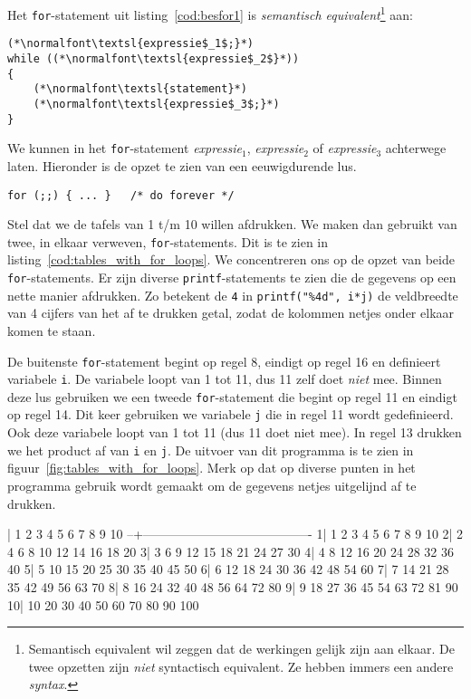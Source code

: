 Het \texttt{for}-statement uit listing~\ref{cod:besfor1} is \textsl{semantisch equivalent}\footnote{Semantisch equivalent wil zeggen dat de werkingen gelijk zijn aan elkaar. De twee opzetten zijn \textsl{niet} syntactisch equivalent. Ze hebben immers een andere \textsl{syntax}.} aan:

\begin{lstlisting}[caption=\texttt{while}-statement als \texttt{for}-statement.,label=cod:besforaswhile]
(*\normalfont\textsl{expressie$_1$;}*)
while ((*\normalfont\textsl{expressie$_2$}*))
{
    (*\normalfont\textsl{statement}*)
    (*\normalfont\textsl{expressie$_3$;}*)
}
\end{lstlisting}

We kunnen in het \texttt{for}-statement \textsl{expressie$_1$}, \textsl{expressie$_2$} of \textsl{expressie}$_3$ achterwege laten. Hieronder is de opzet te zien van een eeuwigdurende lus.

\hspace*{1em}\texttt{for (;;) \{ ... \}\ \ \    /* do forever */}

Stel dat we de tafels van 1 t/m 10 willen afdrukken. We maken dan gebruikt van twee, in elkaar verweven, \texttt{for}-statements. Dit is te zien in listing~\ref{cod:tables_with_for_loops}. We concentreren ons op de opzet van beide \texttt{for}-statements. Er zijn diverse \texttt{printf}-statements te zien die de gegevens op een nette manier afdrukken.
Zo betekent de \texttt{4} in \texttt{printf("\%4d", i*j)} de veldbreedte van 4 cijfers van het af te drukken getal, zodat de kolommen netjes onder elkaar komen te staan.


De buitenste \texttt{for}-statement begint op regel 8, eindigt op regel 16 en definieert variabele \texttt{i}. De variabele loopt van 1 tot 11, dus 11 zelf doet \textsl{niet} mee. Binnen deze lus gebruiken we een tweede \texttt{for}-statement die begint op regel 11 en eindigt op regel 14. Dit keer gebruiken we variabele \texttt{j} die in regel 11 wordt gedefinieerd. Ook deze variabele loopt van 1 tot 11 (dus 11 doet niet mee). In regel 13 drukken we het product af van \texttt{i} en \texttt{j}. De uitvoer van dit programma is te zien in figuur~\ref{fig:tables_with_for_loops}. Merk op dat op diverse punten in het programma gebruik wordt gemaakt om de gegevens netjes uitgelijnd af te drukken.

\begin{dosbox}[title=Uitvoer van het programma in listing~\ref{cod:tables_with_for_loops}.,label=fig:tables_with_for_loops]
  |   1   2   3   4   5   6   7   8   9  10
--+----------------------------------------
 1|   1   2   3   4   5   6   7   8   9  10
 2|   2   4   6   8  10  12  14  16  18  20
 3|   3   6   9  12  15  18  21  24  27  30
 4|   4   8  12  16  20  24  28  32  36  40
 5|   5  10  15  20  25  30  35  40  45  50
 6|   6  12  18  24  30  36  42  48  54  60
 7|   7  14  21  28  35  42  49  56  63  70
 8|   8  16  24  32  40  48  56  64  72  80
 9|   9  18  27  36  45  54  63  72  81  90
10|  10  20  30  40  50  60  70  80  90 100
\end{dosbox}


